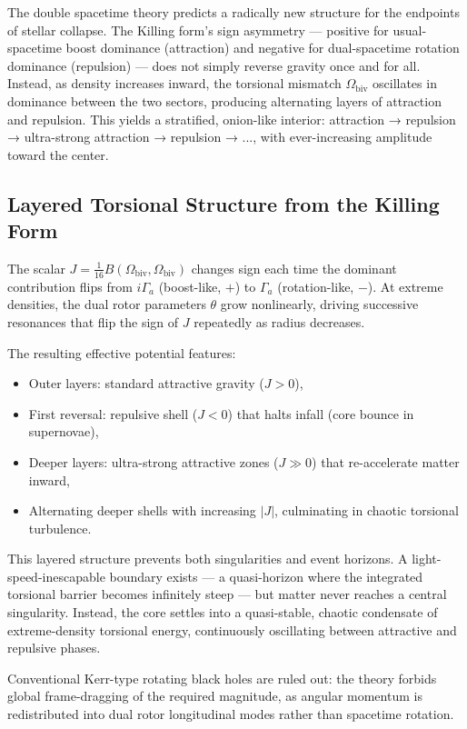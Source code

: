 \documentclass[dvipdfmx,a4paper]{article}
\begin{document}
The double spacetime theory predicts a radically new structure for the endpoints of stellar collapse. The Killing form's sign asymmetry — positive for usual-spacetime boost dominance (attraction) and negative for dual-spacetime rotation dominance (repulsion) — does not simply reverse gravity once and for all. Instead, as density increases inward, the torsional mismatch $\Omega_\text{biv}$ oscillates in dominance between the two sectors, producing alternating layers of attraction and repulsion. This yields a stratified, onion-like interior: attraction → repulsion → ultra-strong attraction → repulsion → ..., with ever-increasing amplitude toward the center.

\subsection{Layered Torsional Structure from the Killing Form}

The scalar $J = \frac{1}{16} B(\Omega_\text{biv}, \Omega_\text{biv})$ changes sign each time the dominant contribution flips from $i\Gamma_a$ (boost-like, $+$) to $\Gamma_a$ (rotation-like, $-$). At extreme densities, the dual rotor parameters $\theta$ grow nonlinearly, driving successive resonances that flip the sign of $J$ repeatedly as radius decreases.

The resulting effective potential features:
\begin{itemize}
\item Outer layers: standard attractive gravity ($J > 0$),
\item First reversal: repulsive shell ($J < 0$) that halts infall (core bounce in supernovae),
\item Deeper layers: ultra-strong attractive zones ($J \gg 0$) that re-accelerate matter inward,
\item Alternating deeper shells with increasing $|J|$, culminating in chaotic torsional turbulence.
\end{itemize}

This layered structure prevents both singularities and event horizons. A light-speed-inescapable boundary exists — a quasi-horizon where the integrated torsional barrier becomes infinitely steep — but matter never reaches a central singularity. Instead, the core settles into a quasi-stable, chaotic condensate of extreme-density torsional energy, continuously oscillating between attractive and repulsive phases.

Conventional Kerr-type rotating black holes are ruled out: the theory forbids global frame-dragging of the required magnitude, as angular momentum is redistributed into dual rotor longitudinal modes rather than spacetime rotation.
\end{document}
